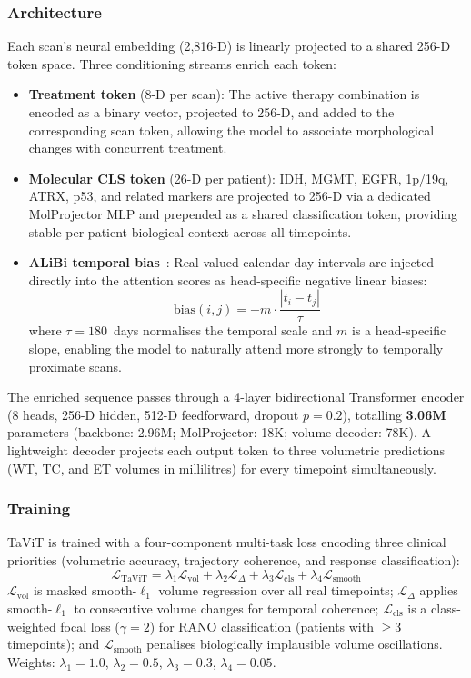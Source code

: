 \documentclass[conference]{IEEEtran}
\begin{document}
\subsubsection{Architecture}
Each scan's neural embedding (2,816-D) is linearly projected to a shared 256-D token space. Three conditioning streams enrich each token:

\begin{itemize}
    \item \textbf{Treatment token} (8-D per scan): The active therapy combination is encoded as a binary vector, projected to 256-D, and added to the corresponding scan token, allowing the model to associate morphological changes with concurrent treatment.
    \item \textbf{Molecular CLS token} (26-D per patient): IDH, MGMT, EGFR, 1p/19q, ATRX, p53, and related markers are projected to 256-D via a dedicated MolProjector MLP and prepended as a shared classification token, providing stable per-patient biological context across all timepoints.
    \item \textbf{ALiBi temporal bias}~\cite{press2022alibi}: Real-valued calendar-day intervals are injected directly into the attention scores as head-specific negative linear biases:
    \begin{equation}
        \text{bias}(i, j) = -m \cdot \frac{|t_i - t_j|}{\tau}
    \end{equation}
    where $\tau = 180$~days normalises the temporal scale and $m$ is a head-specific slope, enabling the model to naturally attend more strongly to temporally proximate scans.
\end{itemize}

The enriched sequence passes through a 4-layer bidirectional Transformer encoder (8 heads, 256-D hidden, 512-D feedforward, dropout $p=0.2$), totalling \textbf{3.06M} parameters (backbone: 2.96M; MolProjector: 18K; volume decoder: 78K). A lightweight decoder projects each output token to three volumetric predictions (WT, TC, and ET volumes in millilitres) for every timepoint simultaneously.

\subsubsection{Training}
TaViT is trained with a four-component multi-task loss encoding three clinical priorities (volumetric accuracy, trajectory coherence, and response classification):
\begin{equation}
    \mathcal{L}_{\text{TaViT}} = \lambda_1 \mathcal{L}_{\text{vol}} + \lambda_2 \mathcal{L}_{\Delta} + \lambda_3 \mathcal{L}_{\text{cls}} + \lambda_4 \mathcal{L}_{\text{smooth}}
\end{equation}
$\mathcal{L}_{\text{vol}}$ is masked smooth-$\ell_1$ volume regression over all real timepoints; $\mathcal{L}_{\Delta}$ applies smooth-$\ell_1$ to consecutive volume changes for temporal coherence; $\mathcal{L}_{\text{cls}}$ is a class-weighted focal loss ($\gamma=2$) for RANO classification (patients with ${\geq}3$ timepoints); and $\mathcal{L}_{\text{smooth}}$ penalises biologically implausible volume oscillations. Weights: $\lambda_1=1.0$, $\lambda_2=0.5$, $\lambda_3=0.3$, $\lambda_4=0.05$.
\end{document}

